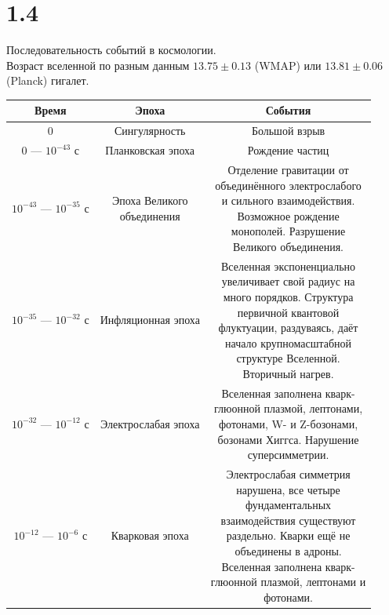 \documentclass[a4paper,14pt]{article}
\makeatletter
\newcommand{\specialcell}[2][c]{%
  \begin{tabular}[#1]{@{}c@{}}#2\end{tabular}}
\makeatother
\begin{document}
\section*{1.4}
\begin{center}
	Последовательность событий в космологии. \\
	Возраст вселенной по разным данным $13.75 \pm 0.13$ (WMAP) или $13.81 \pm 0.06$ (Planck) гигалет.
\end{center}
\begin{center}
\begin{longtable}{|c|c|c|}
\hline
 Время& Эпоха& События\\
\hline
 0& Сингулярность& Большой взрыв\\
\hline
 0 — $10^{-43}$ с& Планковская эпоха& Рождение частиц\\
\hline
 $10^{-43}$ — $10^{-35}$ с & \specialcell{Эпоха Великого\\объединения}& \specialcell{Отделение гравитации от\\ объединённого электрослабого\\ и сильного взаимодействия.\\ Возможное рождение\\ монополей. Разрушение\\ Великого объединения.} \\
\hline
 $10^{-35}$ — $10^{-32}$ с& Инфляционная эпоха& \specialcell{Вселенная экспоненциально\\ увеличивает свой радиус на\\ много порядков. Структура\\ первичной квантовой\\ флуктуации, раздуваясь, даёт\\ начало крупномасштабной\\ структуре Вселенной.\\ Вторичный нагрев.} \\
\hline
 $10^{-32}$ — $10^{-12}$ с& Электрослабая эпоха& \specialcell{Вселенная заполнена кварк-\\глюонной плазмой, лептонами,\\ фотонами, W- и Z-бозонами,\\ бозонами Хиггса. Нарушение\\ суперсимметрии.} \\
\hline
 $10^{-12}$ — $10^{-6}$ с& Кварковая эпоха& \specialcell{Электрослабая симметрия\\ нарушена, все четыре\\ фундаментальных\\ взаимодействия существуют\\ раздельно. Кварки ещё не\\ объединены в адроны.\\ Вселенная заполнена кварк-\\глюонной плазмой, лептонами и\\ фотонами.} \\

\end{longtable}
\end{center}
\end{document}
